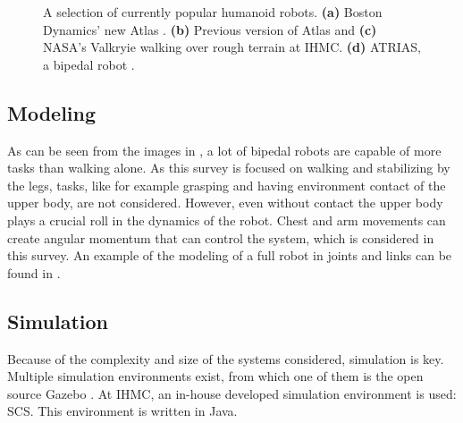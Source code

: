 \begin{figure}[h]
\begin{subfigure}{0.23\textwidth}
  \caption{}
   \label{fig:currentrobotsd}
  \end{subfigure}
  \caption{A selection of currently popular humanoid robots. \textbf{(a)} Boston Dynamics' new Atlas \cite{newatlas}. \textbf{(b)} Previous version of Atlas \cite{oldatlas} and \textbf{(c)} NASA's Valkryie \cite{valkyrie} walking over rough terrain at IHMC. \textbf{(d)} ATRIAS, a bipedal robot \cite{atrias}.}
  \label{fig:currentrobots}
\end{figure}
\subsection{Modeling}
As can be seen from the images in , a lot of bipedal robots are capable of more tasks than walking alone. As this survey is focused on walking and stabilizing by the legs, tasks, like for example grasping and having environment contact of the upper body, are not considered. However, even without contact the upper body plays a crucial roll in the dynamics of the robot. Chest and arm movements can create angular momentum that can control the system, which is considered in this survey. An example of the modeling of a full robot in joints and links can be found in \cite{yamaguchi1999development}.\\
\subsection{Simulation}
Because of the complexity and size of the systems considered, simulation is key. Multiple simulation environments exist, from which one of them is the open source Gazebo \cite{koenig2004design}. At IHMC, an in-house developed simulation environment is used: \ac{SCS}. This environment is written in Java.

